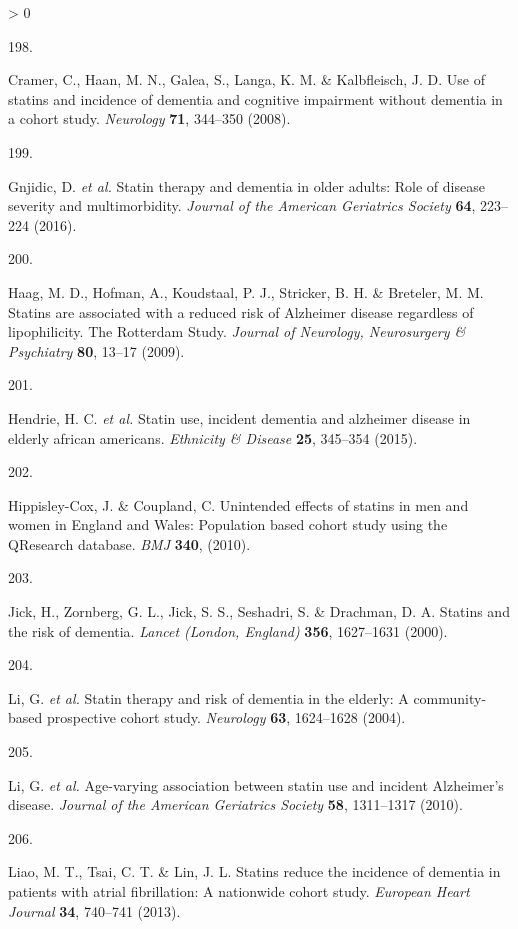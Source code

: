 \documentclass[a4paper, twoside]{templates/ociamthesis}
\newlength{\cslhangindent}
\newlength{\csllabelwidth}
\newenvironment{CSLReferences}[3] %
 {%
  \setlength{\parindent}{0pt}
  \ifodd #1 \everypar{\setlength{\hangindent}{\cslhangindent}}\ignorespaces\fi
  \ifnum #2 > 0
  \setlength{\parskip}{#2\baselineskip}
  \fi
 }%
 {}
\newcommand{\CSLLeftMargin}[1]{\parbox[t]{\maxof{\widthof{#1}}{\csllabelwidth}}{#1}}
\newcommand{\CSLRightInline}[1]{\parbox[t]{\linewidth - \csllabelwidth}{#1}}
\begin{document}
\begin{CSLReferences}{0}{0}
\leavevmode\hypertarget{ref-cramer2008}{}%
\CSLLeftMargin{198. }
\CSLRightInline{Cramer, C., Haan, M. N., Galea, S., Langa, K. M. \& Kalbfleisch, J. D. Use of statins and incidence of dementia and cognitive impairment without dementia in a cohort study. \emph{Neurology} \textbf{71}, 344--350 (2008).}

\leavevmode\hypertarget{ref-gnjidic2016}{}%
\CSLLeftMargin{199. }
\CSLRightInline{Gnjidic, D. \emph{et al.} Statin therapy and dementia in older adults: Role of disease severity and multimorbidity. \emph{Journal of the American Geriatrics Society} \textbf{64}, 223--224 (2016).}

\leavevmode\hypertarget{ref-haag2009}{}%
\CSLLeftMargin{200. }
\CSLRightInline{Haag, M. D., Hofman, A., Koudstaal, P. J., Stricker, B. H. \& Breteler, M. M. Statins are associated with a reduced risk of {Alzheimer} disease regardless of lipophilicity. {The Rotterdam Study}. \emph{Journal of Neurology, Neurosurgery \& Psychiatry} \textbf{80}, 13--17 (2009).}

\leavevmode\hypertarget{ref-hendrie2015}{}%
\CSLLeftMargin{201. }
\CSLRightInline{Hendrie, H. C. \emph{et al.} Statin use, incident dementia and alzheimer disease in elderly african americans. \emph{Ethnicity \& Disease} \textbf{25}, 345--354 (2015).}

\leavevmode\hypertarget{ref-hippisley-cox2010}{}%
\CSLLeftMargin{202. }
\CSLRightInline{Hippisley-Cox, J. \& Coupland, C. Unintended effects of statins in men and women in {England} and {Wales}: Population based cohort study using the {QResearch} database. \emph{BMJ} \textbf{340}, (2010).}

\leavevmode\hypertarget{ref-jick2000}{}%
\CSLLeftMargin{203. }
\CSLRightInline{Jick, H., Zornberg, G. L., Jick, S. S., Seshadri, S. \& Drachman, D. A. Statins and the risk of dementia. \emph{Lancet (London, England)} \textbf{356}, 1627--1631 (2000).}

\leavevmode\hypertarget{ref-li2004}{}%
\CSLLeftMargin{204. }
\CSLRightInline{Li, G. \emph{et al.} Statin therapy and risk of dementia in the elderly: A community-based prospective cohort study. \emph{Neurology} \textbf{63}, 1624--1628 (2004).}

\leavevmode\hypertarget{ref-li2010}{}%
\CSLLeftMargin{205. }
\CSLRightInline{Li, G. \emph{et al.} Age-varying association between statin use and incident {Alzheimer}'s disease. \emph{Journal of the American Geriatrics Society} \textbf{58}, 1311--1317 (2010).}

\leavevmode\hypertarget{ref-liao2013}{}%
\CSLLeftMargin{206. }
\CSLRightInline{Liao, M. T., Tsai, C. T. \& Lin, J. L. Statins reduce the incidence of dementia in patients with atrial fibrillation: A nationwide cohort study. \emph{European Heart Journal} \textbf{34}, 740--741 (2013).}


\end{CSLReferences}
\end{document}
